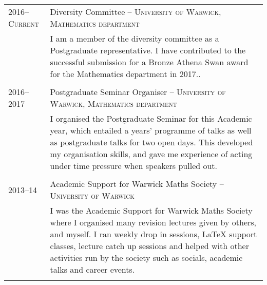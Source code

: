 \documentclass[a4paper,10pt]{article}
\begin{document}
\begin{tabular}{p{2.25cm}|p{15cm}}
	\textsc{2016--Current}& Diversity Committee -- \textsc{University of Warwick, Mathematics department}\\&\footnotesize{I am a member of the diversity committee as a Postgraduate representative. I have contributed to the successful submission for a Bronze Athena Swan award for the Mathematics department in 2017..}\\\multicolumn{2}{c}{} \\
	\textsc{2016--2017}& Postgraduate Seminar Organiser -- \textsc{University of Warwick, Mathematics department}\\&\footnotesize{I organised the Postgraduate Seminar for this Academic year, which entailed a years’ programme of talks as well as postgraduate talks for two open days. This developed my organisation skills, and gave me experience of acting under time pressure when speakers pulled out.}\\\multicolumn{2}{c}{} \\
	\textsc{2013--14}& Academic Support for Warwick Maths Society -- \textsc{University of Warwick}\\&\footnotesize{I was the Academic Support for Warwick Maths Society where I organised many revision lectures given by others, and myself. I ran weekly drop in sessions, LaTeX support classes, lecture catch up sessions and helped with other activities run by the society such as socials, academic talks and career events.}\\\multicolumn{2}{c}{} \\
\end{tabular}
\end{document}
